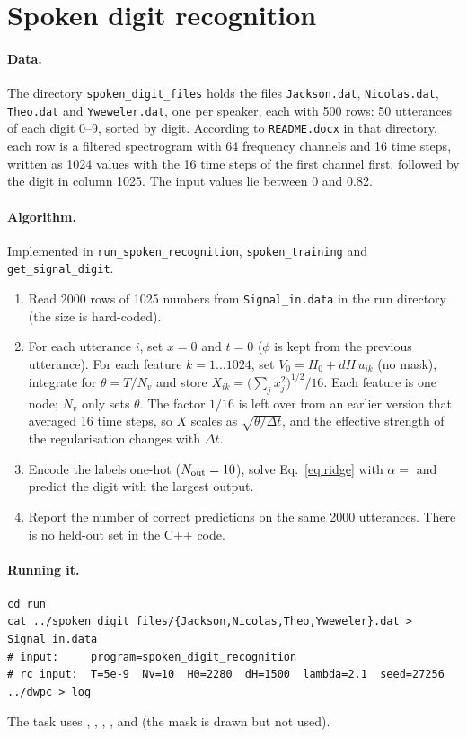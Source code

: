 \documentclass[11pt,a4paper]{report}
\newcommand{\key}[1]{\texttt{\detokenize{#1}}}
\begin{document}
\section{Spoken digit recognition}\label{sec:rcspoken}
\paragraph{Data.} The directory \texttt{spoken\_\allowbreak digit\_\allowbreak files} holds the files \texttt{Jackson.dat}, \texttt{Nicolas.dat}, \texttt{Theo.dat} and \texttt{Yweweler.dat}, one per speaker, each with 500 rows: 50 utterances of each digit 0--9, sorted by digit. According to \texttt{README.docx} in that directory, each row is a filtered spectrogram with 64 frequency channels and 16 time steps, written as 1024 values with the 16 time steps of the first channel first, followed by the digit in column 1025. The input values lie between 0 and 0.82.

\paragraph{Algorithm.} Implemented in \texttt{run\_\allowbreak spoken\_\allowbreak recognition}, \texttt{spoken\_\allowbreak training} and \texttt{get\_\allowbreak signal\_\allowbreak digit}.
\begin{enumerate}
\item Read 2000 rows of 1025 numbers from \texttt{Signal\_in.data} in the run directory (the size is hard-coded).
\item For each utterance $i$, set $x=0$ and $t=0$ ($\phi$ is kept from the previous utterance). For each feature $k=1\dots1024$, set $V_0 = H_0 + dH\,u_{ik}$ (no mask), integrate for $\theta=T/N_v$ and store $X_{ik} = \big(\sum_j x_j^2\big)^{1/2}/16$. Each feature is one node; $N_v$ only sets $\theta$. The factor $1/16$ is left over from an earlier version that averaged 16 time steps, so $X$ scales as $\sqrt{\theta/\Delta t}$, and the effective strength of the regularisation changes with $\Delta t$.
\item Encode the labels one-hot ($N_{\rm out}=10$), solve Eq.~\eqref{eq:ridge} with $\alpha=$ \key{lambda} and predict the digit with the largest output.
\item Report the number of correct predictions on the same 2000 utterances. There is no held-out set in the C++ code.
\end{enumerate}

\paragraph{Running it.}
\begin{lstlisting}
cd run
cat ../spoken_digit_files/{Jackson,Nicolas,Theo,Yweweler}.dat > Signal_in.data
# input:     program=spoken_digit_recognition
# rc_input:  T=5e-9  Nv=10  H0=2280  dH=1500  lambda=2.1  seed=27256
../dwpc > log
\end{lstlisting}
The task uses \key{T}, \key{Nv}, \key{H0}, \key{dH}, \key{lambda} and \key{seed} (the mask is drawn but not used).
\end{document}
